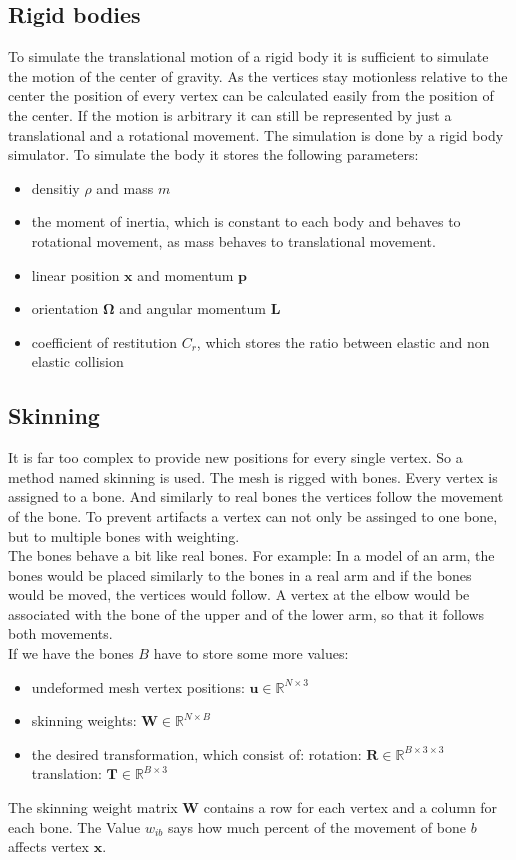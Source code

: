 \subsection{Rigid bodies}
	To simulate the translational motion of a rigid body it is sufficient to simulate the motion of the center of gravity. As the vertices stay motionless relative to the center the position of every vertex can be calculated easily from the position of the center. 
	If the motion is arbitrary it can still be represented by just a translational and a rotational movement. 
	The simulation is done by a rigid body simulator. To simulate the body it stores the following parameters:
	\begin{itemize}
		\item densitiy $\rho$ and mass $m$
		\item the moment of inertia, which is constant to each body and behaves to rotational movement, as mass behaves to translational movement.
		\item linear position $\bm{x}$ and momentum $\bm{p}$
		\item orientation $\bm \Omega$ and angular momentum $\bm L$
		\item coefficient of restitution $C_r$, which stores the ratio between elastic and non elastic collision
	\end{itemize}
	
\subsection{Skinning}
	It is far too complex to provide new positions for every single vertex. So a method named skinning is used. The mesh is rigged with bones. Every vertex is assigned to a bone. And similarly to real bones the vertices follow the movement of the bone. To prevent artifacts a vertex can not only be assinged to one bone, but to multiple bones with weighting. \\
	The bones behave a bit like real bones. For example: In a model of an arm, the bones would be placed similarly to the bones in a real arm and if the bones would be moved, the vertices would follow. A vertex at the elbow would be associated with the bone of the upper and of the lower arm, so that it follows both movements. \\
	If we have the bones $B$ have to store some more values:
\begin{itemize}
	\item undeformed mesh vertex positions: $\bm{u} \in \mathbb{R}^{N \times 3}$	
	\item skinning weights: $\bm{W} \in \mathbb{R} ^{N \times B}$
	\item the desired transformation, which consist of:
		\subitem rotation: $\bm{R} \in \mathbb{R}^{B\times 3\times 3}$
		\subitem translation: $\bm{T}\in \mathbb{R}^{B\times 3}$
\end{itemize}
The skinning weight matrix $\bm{W}$ contains a row for each vertex and a column for each bone. The Value $w_{ib}$ says how much percent of the movement of bone $b$ affects vertex $\bm x$.\\

